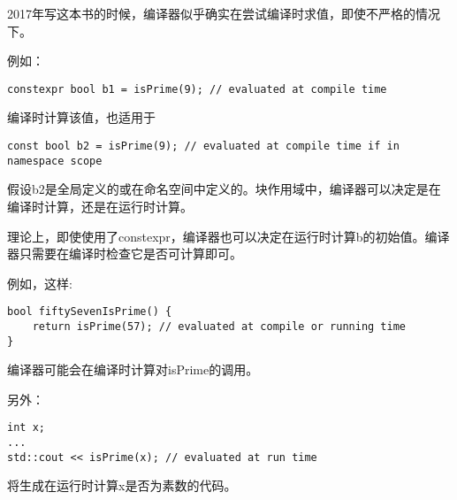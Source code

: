 \begin{tcolorbox}[colback=webgreen!5!white,colframe=webgreen!75!black]
\hspace*{0.75cm}2017年写这本书的时候，编译器似乎确实在尝试编译时求值，即使不严格的情况下。
\end{tcolorbox}

例如：

\begin{lstlisting}[style=styleCXX]
constexpr bool b1 = isPrime(9); // evaluated at compile time
\end{lstlisting}

编译时计算该值，也适用于

\begin{lstlisting}[style=styleCXX]
const bool b2 = isPrime(9); // evaluated at compile time if in namespace scope
\end{lstlisting}

假设b2是全局定义的或在命名空间中定义的。块作用域中，编译器可以决定是在编译时计算，还是在运行时计算。

\begin{tcolorbox}[colback=webgreen!5!white,colframe=webgreen!75!black]
\hspace*{0.75cm}理论上，即使使用了constexpr，编译器也可以决定在运行时计算b的初始值。编译器只需要在编译时检查它是否可计算即可。
\end{tcolorbox}

例如，这样:

\begin{lstlisting}[style=styleCXX]
bool fiftySevenIsPrime() {
	return isPrime(57); // evaluated at compile or running time
}
\end{lstlisting}

编译器可能会在编译时计算对isPrime的调用。

另外：

\begin{lstlisting}[style=styleCXX]
int x;
...
std::cout << isPrime(x); // evaluated at run time
\end{lstlisting}

将生成在运行时计算x是否为素数的代码。

